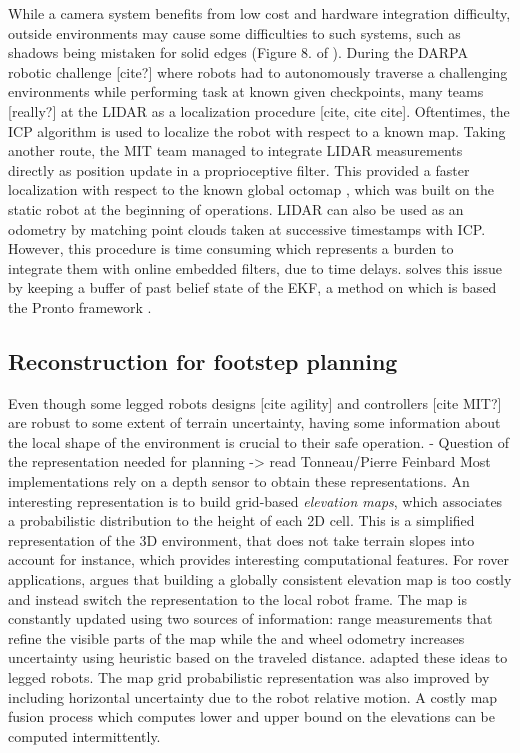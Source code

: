 While a camera system benefits from low cost and hardware integration difficulty, outside environments 
may cause some difficulties to such systems, such as shadows being mistaken for solid edges (Figure 8. of \cite{fallon2014drift}).
During the DARPA robotic challenge [cite?] where robots had to autonomously traverse a challenging environments while performing task at known given checkpoints, 
many teams [really?] at the LIDAR as a localization procedure [cite, cite cite]. Oftentimes, the ICP algorithm is used to localize the robot 
with respect to a known map. Taking another route, the MIT team \cite{fallon2014drift} managed to integrate LIDAR measurements directly as position update in a proprioceptive
filter. This provided a faster localization with respect to the known global octomap \cite{hornung2013octomap}, which was built on the static robot at the beginning of operations. 
LIDAR can also be used as an odometry by matching point clouds taken at successive timestamps with ICP. However, this procedure is time consuming 
which represents a burden to integrate them with online embedded filters, due to time delays. \cite{nobili2017heterogeneous} solves this issue by keeping a
buffer of past belief state of the EKF, a method on which is based the Pronto framework \cite{camurri2020pronto}.




\subsection{Reconstruction for footstep planning}
Even though some legged robots designs [cite agility] and controllers [cite MIT?] are robust to some extent of terrain uncertainty, having some information about the local
shape of the environment is crucial to their safe operation. 
- Question of the representation needed for planning -> read Tonneau/Pierre Feinbard
Most implementations rely on a depth sensor to obtain these representations. 
An interesting representation is to build grid-based \textit{elevation maps}, which associates a probabilistic distribution to the height of each 2D cell. 
This is a simplified representation of the 3D environment, that does not take terrain slopes into account for instance, which provides interesting computational features. 
For rover applications, \cite{kleiner2007real} argues that building a globally consistent elevation map is too costly and instead switch the representation to the local robot frame. 
The map is constantly updated using two sources of information: range measurements that refine the visible parts of the map while the and wheel odometry increases uncertainty using heuristic
based on the traveled distance. \cite{fankhauser2014robot, fankhauser2018probabilistic} adapted these ideas to legged robots. The map grid probabilistic representation
was also improved by including horizontal uncertainty due to the robot relative motion. A costly map fusion process which computes lower and upper bound on the elevations
can be computed intermittently. 

